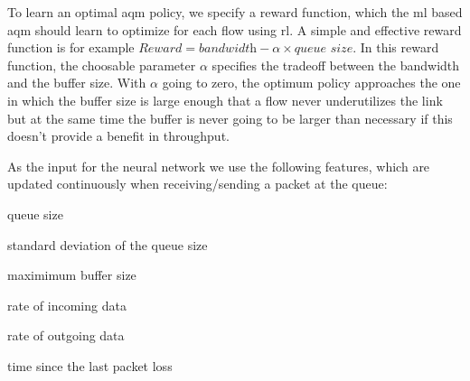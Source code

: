 \documentclass[conference]{IEEEtran}
\begin{document}
To learn an optimal \gls{aqm} policy, we specify a reward function, which the \gls{ml} based \gls{aqm} should learn to optimize for each flow using \gls{rl}. A simple and effective reward function is for example $\textit{Reward} = \textit{bandwidth}-\alpha\times\textit{queue size}$. In this reward function, the choosable parameter $\alpha$ specifies the tradeoff between the bandwidth and the buffer size. With $\alpha$ going to zero, the optimum policy approaches the one in which the buffer size is large enough that a flow never underutilizes the link but at the same time the buffer is never going to be larger than necessary if this doesn't provide a benefit in throughput. 

As the input for the neural network we use the following features, which are updated continuously when receiving/sending a packet at the queue: 
\begin{itemize*}
\item queue size
\item standard deviation of the queue size 
\item maximimum buffer size
\item rate of incoming data
\item rate of outgoing data
\item time since the last packet loss
\end{itemize*}
\end{document}
